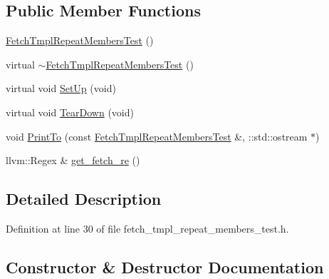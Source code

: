 \subsection*{Public Member Functions}
\begin{DoxyCompactItemize}
\item 
\hyperlink{classclang_1_1tidy_1_1pagesjaunes_1_1test_1_1_fetch_tmpl_repeat_members_test_ac8221a749dbd5872f3b2d311c6c71b59}{Fetch\+Tmpl\+Repeat\+Members\+Test} ()
\item 
virtual \hyperlink{classclang_1_1tidy_1_1pagesjaunes_1_1test_1_1_fetch_tmpl_repeat_members_test_a256c68f32b6c4d559f1815df094c9253}{$\sim$\+Fetch\+Tmpl\+Repeat\+Members\+Test} ()
\item 
virtual void \hyperlink{classclang_1_1tidy_1_1pagesjaunes_1_1test_1_1_fetch_tmpl_repeat_members_test_a170d0c160836fc75787f09d7a944d81b}{Set\+Up} (void)
\item 
virtual void \hyperlink{classclang_1_1tidy_1_1pagesjaunes_1_1test_1_1_fetch_tmpl_repeat_members_test_a7ba8b0452129387434e8b0ccb7bc3cd7}{Tear\+Down} (void)
\item 
void \hyperlink{classclang_1_1tidy_1_1pagesjaunes_1_1test_1_1_fetch_tmpl_repeat_members_test_aea676e3f0463e3817a8e7521ec102dc0}{Print\+To} (const \hyperlink{classclang_1_1tidy_1_1pagesjaunes_1_1test_1_1_fetch_tmpl_repeat_members_test}{Fetch\+Tmpl\+Repeat\+Members\+Test} \&, \+::std\+::ostream $\ast$)
\item 
llvm\+::\+Regex \& \hyperlink{classclang_1_1tidy_1_1pagesjaunes_1_1test_1_1_fetch_tmpl_repeat_members_test_a433c406472c31bb1edef60df46505aab}{get\+\_\+fetch\+\_\+re} ()
\end{DoxyCompactItemize}


\subsection{Detailed Description}


Definition at line 30 of file fetch\+\_\+tmpl\+\_\+repeat\+\_\+members\+\_\+test.\+h.



\subsection{Constructor \& Destructor Documentation}
\mbox{\label{classclang_1_1tidy_1_1pagesjaunes_1_1test_1_1_fetch_tmpl_repeat_members_test_ac8221a749dbd5872f3b2d311c6c71b59}} 
